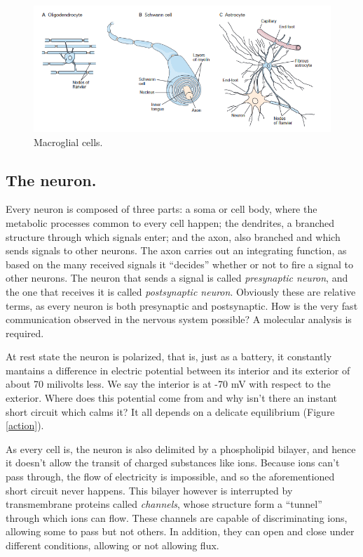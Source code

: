 \begin{figure}[H]
	\centering

	\includegraphics[width=\linewidth]{media/5-glia.png}
	\caption{Macroglial cells.}
	\label{glia}
\end{figure}

\subsection{The neuron.}

Every neuron is composed of three parts: a soma or cell body, where the metabolic processes common to every cell happen; the dendrites, a branched structure through which signals enter; and the axon, also branched and which sends signals to other neurons. The axon carries out an integrating function, as based on the many received signals it \enquote{decides} whether or not to fire a signal to other neurons. The neuron that sends a signal is called \textit{presynaptic neuron}, and the one that receives it is called \textit{postsynaptic neuron}. Obviously these are relative terms, as every neuron is both presynaptic and postsynaptic. How is the very fast communication observed in the nervous system possible? A molecular analysis is required.

At rest state the neuron is polarized, that is, just as a battery, it constantly mantains a difference in electric potential between its interior and its exterior of about 70 milivolts less. We say the interior is at -70 mV with respect to the exterior. Where does this potential come from and why isn't there an instant short circuit which calms it? It all depends on a delicate equilibrium (Figure \ref{action}).

As every cell is, the neuron is also delimited by a phospholipid bilayer, and hence it doesn't allow the transit of charged substances like ions. Because ions can't pass through, the flow of electricity is impossible, and so the aforementioned short circuit never happens. This bilayer however is interrupted by transmembrane proteins called \textit{channels}, whose structure form a \enquote{tunnel} through which ions can flow. These channels are capable of discriminating ions, allowing some to pass but not others. In addition, they can open and close under different conditions, allowing or not allowing flux.

